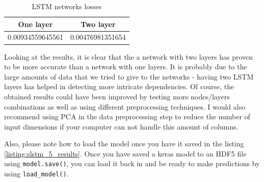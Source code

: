 \documentclass[12pt, a4paper]{article}
\begin{document}
\begin{table}[h!]
\centering
\caption{LSTM networks losses}
\begin{tabular}{ | c | c |}
  \hline
  One layer & Two layer \\
  \hline
  0.00934559645561 & 0.00476981351654 \\
  \hline
\end{tabular}
\label{table:lstm}
\end{table}

Looking at the results, it is clear that the a network with two layers has proven to be more accurate than a network with one layers. It is probably due to the large amounts of data that we tried to give to the networks - having two LSTM layers has helped in detecting more intricate dependencies. Of course, the obtained results could have been improved by testing more nodes/layers combinations as well as using different preprocessing techniques. I would also recommend using PCA in the data preprocessing step to reduce the number of input dimensions if your computer can not handle this amount of columns.

Also, please note how to load the model once you have it saved in the listing \ref{listing:slstm_5_results}. Once you have saved a keras model to an HDF5 file using \texttt{model.save()}, you can load it back in and be ready to make predictions by using \texttt{load\_model()}.

\bgroup
  \inputminted[linenos, breaklines=true, fontsize=\scriptsize, firstnumber=last]{python}{src/stocks/lstm/5_results.py}
  \label{listing:slstm_5_results}
\egroup
\end{document}
